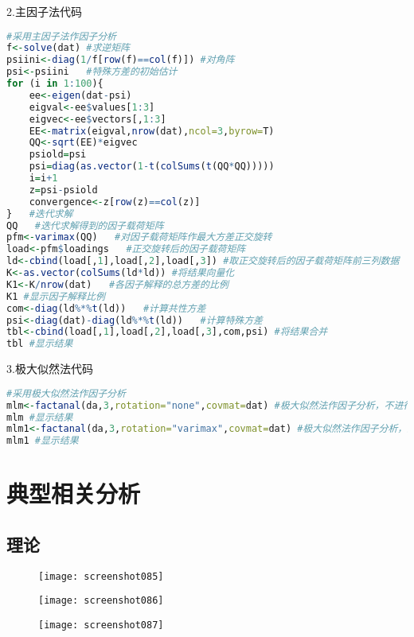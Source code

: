 \documentclass[11pt,a4paper,oneside]{book}
\begin{document}
2.主因子法代码
\begin{lstlisting}[language=r]
#采用主因子法作因子分析
f<-solve(dat) #求逆矩阵
psiini<-diag(1/f[row(f)==col(f)]) #对角阵
psi<-psiini   #特殊方差的初始估计
for (i in 1:100){
	ee<-eigen(dat-psi) 
	eigval<-ee$values[1:3]
	eigvec<-ee$vectors[,1:3]
	EE<-matrix(eigval,nrow(dat),ncol=3,byrow=T)
	QQ<-sqrt(EE)*eigvec
	psiold=psi
	psi=diag(as.vector(1-t(colSums(t(QQ*QQ)))))
	i=i+1
	z=psi-psiold
	convergence<-z[row(z)==col(z)]
}   #迭代求解
QQ   #迭代求解得到的因子载荷矩阵
pfm<-varimax(QQ)   #对因子载荷矩阵作最大方差正交旋转
load<-pfm$loadings   #正交旋转后的因子载荷矩阵
ld<-cbind(load[,1],load[,2],load[,3]) #取正交旋转后的因子载荷矩阵前三列数据
K<-as.vector(colSums(ld*ld)) #将结果向量化  
K1<-K/nrow(dat)   #各因子解释的总方差的比例
K1 #显示因子解释比例
com<-diag(ld%*%t(ld))   #计算共性方差
psi<-diag(dat)-diag(ld%*%t(ld))   #计算特殊方差   
tbl<-cbind(load[,1],load[,2],load[,3],com,psi) #将结果合并
tbl #显示结果
\end{lstlisting}

3.极大似然法代码
\begin{lstlisting}[language=r]
#采用极大似然法作因子分析
mlm<-factanal(da,3,rotation="none",covmat=dat) #极大似然法作因子分析，不进行正交旋转
mlm #显示结果
mlm1<-factanal(da,3,rotation="varimax",covmat=dat) #极大似然法作因子分析，进行正交旋转
mlm1 #显示结果
\end{lstlisting}

\chapter{典型相关分析}
\section{理论}
\begin{figure}[H]
	\centering
	\texttt{[image: screenshot085]}
\end{figure}
\begin{figure}[H]
	\centering
	\texttt{[image: screenshot086]}
\end{figure}
\begin{figure}[H]
	\centering
	\texttt{[image: screenshot087]}
\end{figure}
\end{document}

